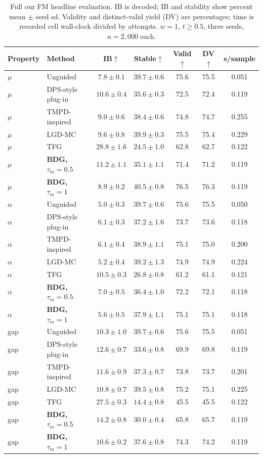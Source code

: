 \documentclass{article}
\begin{document}
\begin{table}[!htbp]
\centering\small
\caption{Full our FM headline evaluation. IB is decoded; IB and stability show percent mean $\pm$ seed sd. Validity and distinct-valid yield (DV) are percentages; time is recorded cell wall-clock divided by attempts. $w=1$, $t\ge0.5$, three seeds, $n=2{,}000$ each.}
\label{tab:full-fm}
\begin{tabular}{llccccc}
\toprule
Property & Method & IB$\uparrow$ & Stable$\uparrow$ & Valid$\uparrow$ & DV$\uparrow$ & s/sample\\
\midrule
$\mu$ & Unguided & $7.8\pm0.1$ & $39.7\pm0.6$ & 75.6 & 75.5 & 0.051\\
$\mu$ & DPS-style plug-in & $10.6\pm0.4$ & $35.6\pm0.3$ & 72.5 & 72.4 & 0.119\\
$\mu$ & TMPD-inspired & $9.0\pm0.6$ & $38.4\pm0.6$ & 74.8 & 74.7 & 0.255\\
$\mu$ & LGD-MC & $9.6\pm0.8$ & $39.9\pm0.3$ & 75.5 & 75.4 & 0.229\\
$\mu$ & TFG & $28.8\pm1.6$ & $24.5\pm1.0$ & 62.8 & 62.7 & 0.122\\
$\mu$ & \textbf{BDG, $\tau_m=0.5$} & $11.2\pm1.1$ & $35.1\pm1.1$ & 71.4 & 71.2 & 0.119\\
$\mu$ & \textbf{BDG, $\tau_m=1$} & $8.9\pm0.2$ & $40.5\pm0.8$ & 76.5 & 76.3 & 0.119\\
\midrule
$\alpha$ & Unguided & $5.0\pm0.3$ & $39.7\pm0.6$ & 75.6 & 75.5 & 0.050\\
$\alpha$ & DPS-style plug-in & $6.1\pm0.3$ & $37.2\pm1.6$ & 73.7 & 73.6 & 0.118\\
$\alpha$ & TMPD-inspired & $6.1\pm0.4$ & $38.9\pm1.1$ & 75.1 & 75.0 & 0.200\\
$\alpha$ & LGD-MC & $5.2\pm0.4$ & $39.2\pm1.3$ & 74.9 & 74.9 & 0.224\\
$\alpha$ & TFG & $10.5\pm0.3$ & $26.8\pm0.8$ & 61.2 & 61.1 & 0.121\\
$\alpha$ & \textbf{BDG, $\tau_m=0.5$} & $7.0\pm0.5$ & $36.4\pm1.0$ & 72.2 & 72.1 & 0.118\\
$\alpha$ & \textbf{BDG, $\tau_m=1$} & $5.6\pm0.5$ & $37.9\pm1.1$ & 75.1 & 75.1 & 0.118\\
\midrule
gap & Unguided & $10.3\pm1.0$ & $39.7\pm0.6$ & 75.6 & 75.5 & 0.051\\
gap & DPS-style plug-in & $12.6\pm0.7$ & $33.6\pm0.8$ & 69.9 & 69.8 & 0.119\\
gap & TMPD-inspired & $11.6\pm0.9$ & $37.3\pm0.7$ & 73.8 & 73.7 & 0.201\\
gap & LGD-MC & $10.8\pm0.7$ & $39.5\pm0.8$ & 75.2 & 75.1 & 0.225\\
gap & TFG & $27.5\pm0.3$ & $14.4\pm0.8$ & 45.5 & 45.5 & 0.122\\
gap & \textbf{BDG, $\tau_m=0.5$} & $14.2\pm0.8$ & $30.0\pm0.4$ & 65.8 & 65.7 & 0.119\\
gap & \textbf{BDG, $\tau_m=1$} & $10.6\pm0.2$ & $37.6\pm0.8$ & 74.3 & 74.2 & 0.119\\
\bottomrule
\end{tabular}
\end{table}
\end{document}
